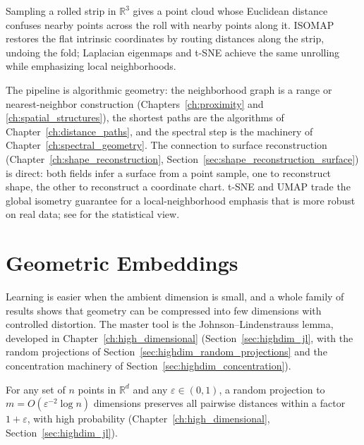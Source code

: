 \begin{example}\label{ex:data_ml_swiss_roll}
  Sampling a rolled strip in $\mathbb{R}^3$ gives a point cloud whose
  Euclidean distance confuses nearby points across the roll with nearby
  points along it. ISOMAP restores the flat intrinsic coordinates by routing
  distances along the strip, undoing the fold; Laplacian eigenmaps and t-SNE
  achieve the same unrolling while emphasizing local neighborhoods.
\end{example}

\begin{remark}
  The pipeline is algorithmic geometry: the neighborhood graph is a range or
  nearest-neighbor construction (Chapters~\ref{ch:proximity} and
  \ref{ch:spatial_structures}), the shortest paths are the algorithms of
  Chapter~\ref{ch:distance_paths}, and the spectral step is the machinery of
  Chapter~\ref{ch:spectral_geometry}. The connection to surface
  reconstruction (Chapter~\ref{ch:shape_reconstruction},
  Section~\ref{sec:shape_reconstruction_surface}) is direct: both fields
  infer a surface from a point sample, one to reconstruct shape, the other
  to reconstruct a coordinate chart. t-SNE and UMAP trade the global
  isometry guarantee for a local-neighborhood emphasis that is more robust
  on real data; see \cite{bishop2006,hastie2009} for the statistical view.
\end{remark}


\section{Geometric Embeddings}
\label{sec:data_ml_embeddings}

Learning is easier when the ambient dimension is small, and a whole family
of results shows that geometry can be compressed into few dimensions with
controlled distortion. The master tool is the Johnson--Lindenstrauss lemma,
developed in Chapter~\ref{ch:high_dimensional}
(Section~\ref{sec:highdim_jl}, with the random projections of
Section~\ref{sec:highdim_random_projections} and the concentration machinery
of Section~\ref{sec:highdim_concentration}).

\begin{theorem}\label{thm:data_ml_jl}
  For any set of $n$ points in $\mathbb{R}^d$ and any $\varepsilon \in
  (0,1)$, a random projection to $m = O(\varepsilon^{-2} \log n)$
  dimensions preserves all pairwise distances within a factor $1 +
  \varepsilon$, with high probability
  (Chapter~\ref{ch:high_dimensional}, Section~\ref{sec:highdim_jl}).
\end{theorem}

